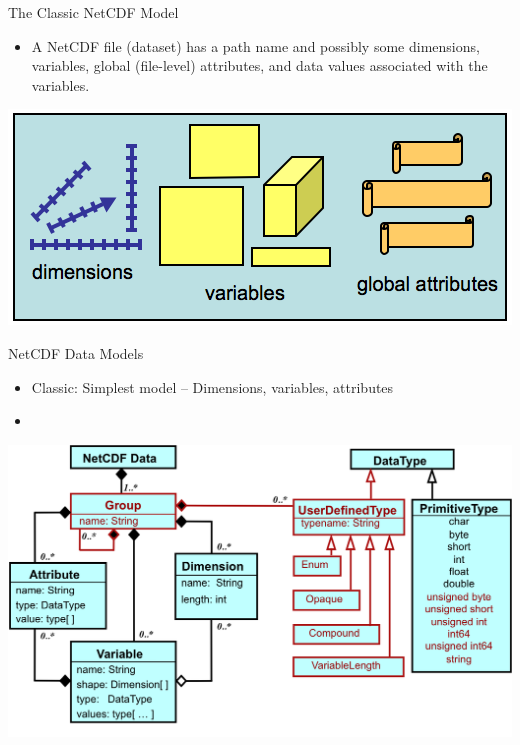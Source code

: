 \documentclass[compress,11pt,xcolor=svgnames,aspectratio=169]{beamer}
\begin{document}
\begin{frame}[fragile] {The Classic NetCDF Model}

\begin{itemize}

\item A NetCDF file (dataset) has a path name and possibly some dimensions, variables, global (file-level) attributes, and data values associated with the variables.

\end{itemize}

\begin{center}
\includegraphics[scale=0.6]{fig/netcdf-classic}
\end{center}

\nocite{netcdf}

\end{frame}

\begin{frame}[fragile] {NetCDF Data Models}

    \begin{itemize}

        \item Classic: Simplest model -- Dimensions, variables, attributes

        \item {\color{red}{Enhanced: More powerful model -- Adds groups, types, nesting}}

    \end{itemize}

    \begin{center}
    \includegraphics[scale=0.45]{fig/nc4-uml}
    \end{center}

\nocite{netcdf}

\end{frame}
\end{document}
